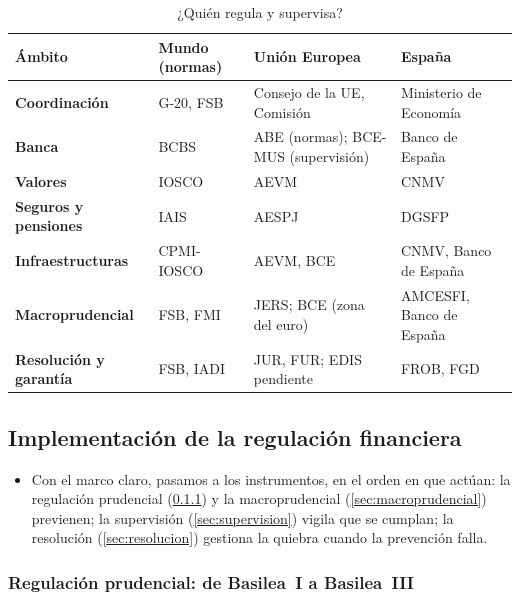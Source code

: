\documentclass[11pt]{article}
\begin{document}
\begin{table}[H]
\centering
\caption{¿Quién regula y supervisa?}\label{tab:marco}
\small
\begin{tabular}{>{\raggedright\arraybackslash}m{2.9cm}|>{\raggedright\arraybackslash}m{3.0cm}|>{\raggedright\arraybackslash}m{3.9cm}|>{\raggedright\arraybackslash}m{3.6cm}}
\rowcolor{tceeazulpalido}\textbf{Ámbito} & \textbf{Mundo (normas)} & \textbf{Unión Europea} & \textbf{España}\\ \hline
\textbf{Coordinación} & G-20, FSB & Consejo de la UE, Comisión & Ministerio de Economía\\ \hline
\textbf{Banca} & BCBS & ABE (normas); BCE-MUS (supervisión) & Banco de España\\ \hline
\textbf{Valores} & IOSCO & AEVM & CNMV\\ \hline
\textbf{Seguros y pensiones} & IAIS & AESPJ & DGSFP\\ \hline
\textbf{Infraestructuras} & CPMI-IOSCO & AEVM, BCE & CNMV, Banco de España\\ \hline
\textbf{Macroprudencial} & FSB, FMI & JERS; BCE (zona del euro) & AMCESFI, Banco de España\\ \hline
\textbf{Resolución y garantía} & FSB, IADI & JUR, FUR; EDIS pendiente & FROB, FGD\\
\end{tabular}
\end{table}

\subsection{Implementación de la regulación financiera}\label{sec:implementacion}

\begin{itemize}
\item Con el marco claro, pasamos a los instrumentos, en el orden en que actúan: la regulación prudencial (\ref{sec:basilea}) y la macroprudencial (\ref{sec:macroprudencial}) previenen; la supervisión (\ref{sec:supervision}) vigila que se cumplan; la resolución (\ref{sec:resolucion}) gestiona la quiebra cuando la prevención falla.
\end{itemize}

\subsubsection{Regulación prudencial: de Basilea~I a Basilea~III}\label{sec:basilea}
\end{document}
